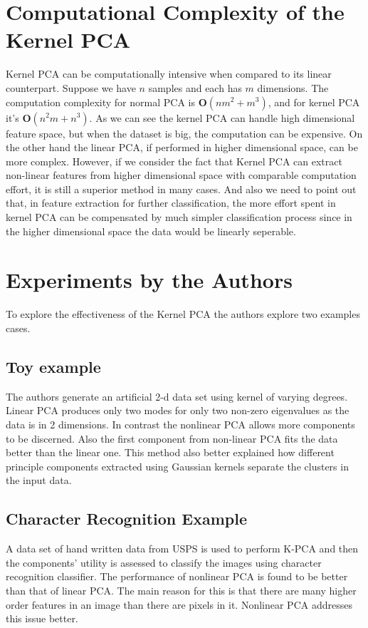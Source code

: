 \section{Computational Complexity of the Kernel PCA}

Kernel PCA can be computationally intensive when compared to its linear counterpart. Suppose we have $n$ samples and each has $m$ dimensions. The computation complexity for normal PCA is $\pmb{O}(nm^2 + m^3)$, and for kernel PCA it's $\pmb{O}(n^2m + n^3)$.
As we can see the kernel PCA can handle high dimensional feature space, but when the dataset is big, the computation can be expensive. On the other hand the linear PCA,
if performed in higher dimensional space, can be more complex.
However, if we consider the fact that Kernel PCA can extract non-linear features from higher dimensional space with comparable computation effort, it is still a superior method in many cases.
And also we need to point out that, in feature extraction for further classification, the more effort spent in kernel PCA can be compensated by much simpler classification process since in the higher dimensional space the data would be linearly seperable.


\section{Experiments by the Authors}
To explore the effectiveness of the Kernel PCA the authors explore two examples cases.

\subsection{Toy example}
The authors generate an artificial 2-d data set using kernel of varying degrees. Linear PCA produces only two modes for only two non-zero eigenvalues as the data is in 2 dimensions. In contrast the nonlinear PCA allows more components to be discerned. Also the first component from non-linear PCA fits the data better than the linear one. This method also better explained how different principle components extracted using Gaussian kernels separate the clusters in the input data.

\subsection{Character Recognition Example}
A data set of hand written data from USPS is used to perform K-PCA and then the components’ utility is assessed to classify the images using character recognition classifier. The performance of nonlinear PCA is found to be better than that of linear PCA. The main reason for this is that there are many higher order features in an image than there are pixels in it. Nonlinear PCA addresses this issue better.

